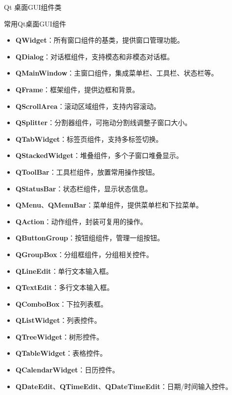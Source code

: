 \documentclass[UTF8,aspectratio=169]{beamer}
\begin{document}
\begin{frame}{Qt 桌面GUI组件类}
    \begin{ytublock}{常用Qt桌面GUI组件}
        {\scriptsize
        \begin{multicols}{2}
        \begin{itemize}
            \item \textbf{QWidget}：所有窗口组件的基类，提供窗口管理功能。
            \item \textbf{QDialog}：对话框组件，支持模态和非模态对话框。
            \item \textbf{QMainWindow}：主窗口组件，集成菜单栏、工具栏、状态栏等。
            \item \textbf{QFrame}：框架组件，提供边框和背景。
            \item \textbf{QScrollArea}：滚动区域组件，支持内容滚动。
            \item \textbf{QSplitter}：分割器组件，可拖动分割线调整子窗口大小。
            \item \textbf{QTabWidget}：标签页组件，支持多标签切换。
            \item \textbf{QStackedWidget}：堆叠组件，多个子窗口堆叠显示。
            \item \textbf{QToolBar}：工具栏组件，放置常用操作按钮。
            \item \textbf{QStatusBar}：状态栏组件，显示状态信息。
            \item \textbf{QMenu}、\textbf{QMenuBar}：菜单组件，提供菜单栏和下拉菜单。
            \item \textbf{QAction}：动作组件，封装可复用的操作。
            \item \textbf{QButtonGroup}：按钮组组件，管理一组按钮。
            \item \textbf{QGroupBox}：分组框组件，分组相关控件。
            \item \textbf{QLineEdit}：单行文本输入框。
            \item \textbf{QTextEdit}：多行文本输入框。
            \item \textbf{QComboBox}：下拉列表框。
            \item \textbf{QListWidget}：列表控件。
            \item \textbf{QTreeWidget}：树形控件。
            \item \textbf{QTableWidget}：表格控件。
            \item \textbf{QCalendarWidget}：日历控件。
            \item \textbf{QDateEdit}、\textbf{QTimeEdit}、\textbf{QDateTimeEdit}：日期/时间输入控件。

\end{itemize}
\end{multicols}}
\end{ytublock}
\end{frame}
\end{document}
